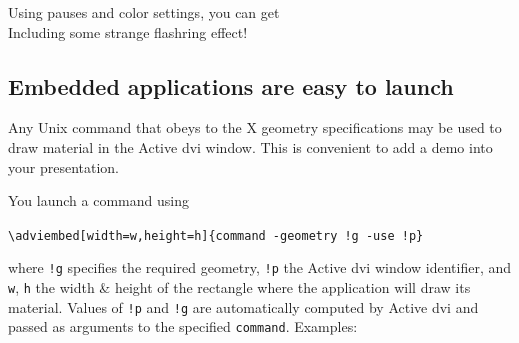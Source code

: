 \documentclass[12pt]{article}
\begin{document}
\noindent
Using pauses and color settings, you can get
\textcolor{red}{}\adviwait
{}
\textcolor{c2}{}\adviwait
{}
\textcolor{c3}{}\adviwait
{}
\textcolor{c4}{}\adviwait
{}
\textcolor{c5}{}\adviwait
{}
\textcolor{c6}{}\adviwait
{}\\
\textcolor{red}{}\adviwait
Including some strange flashring effect!
\textcolor{c6}{}\adviwait[\smallpause]%
\textcolor{c1}{}\adviwait[\smallpause]%
\textcolor{c2}{}\adviwait[\smallpause]%
\textcolor{c3}{}\adviwait[\smallpause]%
\textcolor{c4}{}\adviwait[\smallpause]%
\textcolor{c5}{}\adviwait[\smallpause]%
\textcolor{c6}{}\adviwait[\smallpause]%
\textcolor{c1}{}\adviwait[\smallpause]%
\textcolor{c2}{}\adviwait[\smallpause]%
\textcolor{c3}{}\adviwait[\smallpause]%
\textcolor{c4}{}\adviwait[\smallpause]%
\textcolor{c5}{}\adviwait[\smallpause]%
\textcolor{c6}{}\adviwait[\smallpause]%


\newpage

\subsection* {Embedded applications are easy to launch}

Any Unix command that obeys to the X geometry specifications may be
used to draw material in the Active dvi window.
This is convenient to add a demo into your presentation.

\bigskip

\noindent
You launch a command using

\verb+\adviembed[width=w,height=h]{command -geometry !g -use !p}+

\noindent
where \verb"!g" specifies the required geometry, \verb"!p" the Active dvi
window identifier, and \verb"w", \verb"h" the width \& height of the
rectangle where the application will draw its material.
Values of \verb"!p" and \verb"!g" are automatically computed by Active
dvi and passed as arguments to the specified \verb"command".
 Examples:
\end{document}

